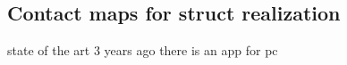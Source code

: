         
   
        
        

\subsection{Contact maps for struct realization}
state of the art 3 years ago
there is an app for pc
